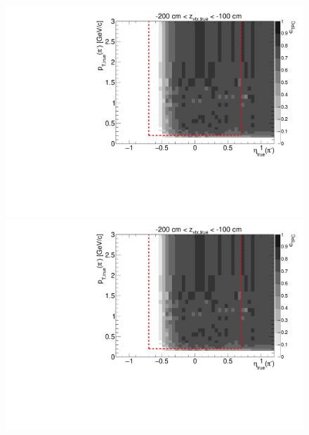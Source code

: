 \begin{figure}[hb]
{  \includegraphics[width=\linewidth,page=16]{graphics/eff/Eff2D_TPC_pion_Minus.pdf}\\
  \includegraphics[width=\linewidth,page=18]{graphics/eff/Eff2D_TPC_pion_Minus.pdf}
}%
\end{figure}


